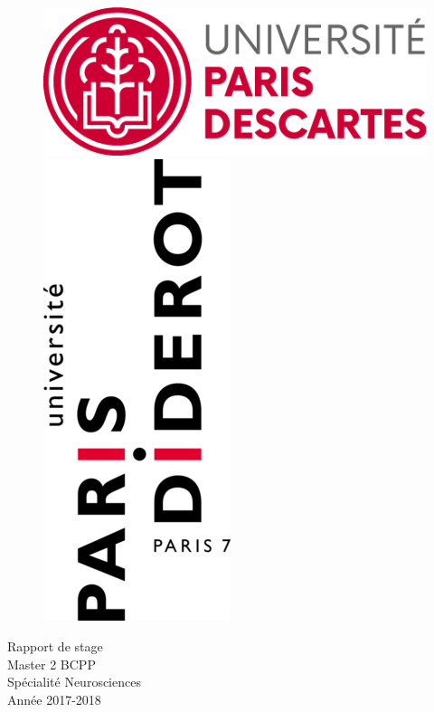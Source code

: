 \begin{center}

\begin{figure}[!h] %
	\begin{minipage}{0.48\textwidth}
		\raggedright %
		\includegraphics*[height=0.1\textheight]{./Images/Logo_P5.png}
	\end{minipage}%
	\hfill
	\begin{minipage}{0.48\textwidth}
		\raggedleft %
		\includegraphics[height=0.2\textheight]{./Images/Logo_P7.png}

	\end{minipage}%
\end{figure}
\vspace*{1.5cm}

Rapport de stage\\
Master 2 BCPP\\
Spécialité Neurosciences\\
Année 2017-2018\\
\vspace{1cm}



\end{center}
